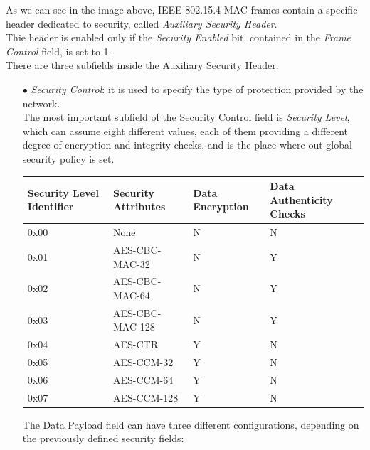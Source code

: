 \documentclass[12pt]{report}
\begin{document}
As we can see in the image above, IEEE 802.15.4 MAC frames contain a specific header dedicated to security, called \emph{Auxiliary Security Header}.\\
Thie header is enabled only if the \emph{Security Enabled} bit, contained in the \emph{Frame Control} field, is set to 1.\\
There are three subfields inside the Auxiliary Security Header:

\begin{itemize}
\setlength{\itemindent}{+4mm}
\item[$\bullet$] \emph{Security Control}: it is used to specify the type of protection provided by the network.\\
The most important subfield of the Security Control field is \emph{Security Level}, which can assume eight different values, each of them providing a different degree of encryption and integrity checks, and is the place where out global security policy is set.

\begin{center}
\small
   \begin{tabular}{ | p{3cm} | l | l | p{3.5cm} |}
    \hline
    Security Level Identifier & Security Attributes & Data Encryption & Data Authenticity Checks \\ \hline
    0x00 & None & N & N \\ \hline
    0x01 & AES-CBC-MAC-32 & N & Y\\ \hline
    0x02 & AES-CBC-MAC-64 & N & Y \\ \hline
    0x03 & AES-CBC-MAC-128 & N & Y\\ \hline
    0x04 & AES-CTR & Y & N\\ \hline
    0x05 & AES-CCM-32 & Y & N\\ \hline
    0x06 & AES-CCM-64 & Y & N\\ \hline
    0x07 & AES-CCM-128 & Y &N\\ \hline
    \end{tabular}
\end{center}
\bigskip
The Data Payload field can have three different configurations, depending on the previously defined security fields:


\end{itemize}
\end{document}
